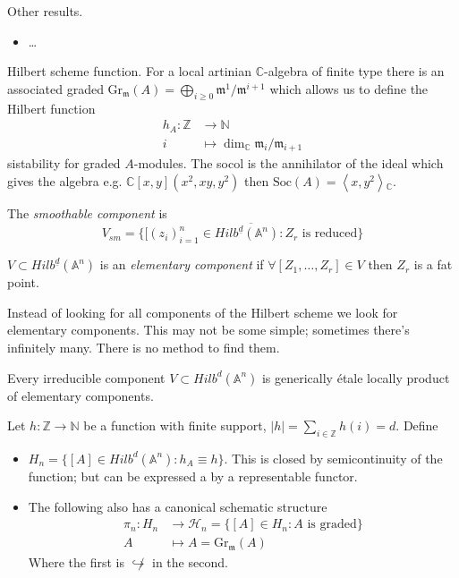 Other results.
\begin{itemize}
\item …
\end{itemize}
Hilbert scheme function.
For a local artinian $\mathbb{C}$-algebra of
finite type there is an associated graded
$\text{Gr}_\mathfrak{m}(A)
=\bigoplus_{i \geq
0}\mathfrak{m}^1/\mathfrak{m}^{i+1}$
which allows us to define the Hilbert
function
$$
\begin{aligned}
h_A: \mathbb{Z} &\longrightarrow \mathbb{N}
\\
i &\longmapsto \dim_\mathbb{C}
\mathfrak{m}_i/\mathfrak{m}_{i+1}
\end{aligned}
$$
sistability for graded $A$-modules.
The socol is the annihilator of
the ideal which gives the algebra
e.g. $\mathbb{C}[x,y](x^2,xy,y^2)$ then
$\text{Soc}(A)=\left\langle{}x,y^2\right\rangle{}_\mathbb{C}
$.

\medskip\noindent
\begin{definition}
\label{definition-smoothable-component}
The {\it smoothable component} is
 $$
V_{sm}=\overline{\{[(z_i)_{i=1}^n \in
Hilb^{\underline{d}}(\mathbb{A}^n):
Z_r\text{ is reduced}\}}
$$
\end{definition}

\begin{definition}
\label{definition-elementary-componenet}
$V \subset
Hilb^{\underline{d}}(\mathbb{A}^n)$ is
an {\it elementary component} if
$\forall [Z_1,\ldots,Z_r] \in V$
then $Z_r$ is a fat point.
\end{definition}

Instead of looking for all components of the
Hilbert scheme
we look for elementary components. This may
not be some simple;
sometimes there's infinitely many. There
is no method to find them.

\begin{theorem}[Irrabaro]
\label{theorem-i}
Every irreducible component $V \subset
Hilb^d(\mathbb{A}^n)$
is generically étale locally product of
elementary components.
\end{theorem}

\begin{definition}
\label{definition-}
Let $h:\mathbb{Z} \to \mathbb{N}$ be a
function
with finite support, $|h|=\sum_{ i \in
\mathbb{Z}}h(i)=d$. Define
\begin{itemize}
\item $H_n=\{[A] \in Hilb^d(\mathbb{A}^n):
h_A \equiv h\}$.
This is closed by semicontinuity of the
function; but can be expressed
a by a representable functor.
\item The following also has a canonical
schematic structure
$$
\begin{aligned}
\pi_n:H_n  &\longrightarrow
\mathcal{H}_n=\{[A] \in H_n: A\text{ is
graded}\} \\
A &\longmapsto A=\text{Gr}_{\mathfrak{m}}(A)
\end{aligned}
$$
Where the first is $\not\hookrightarrow $ in
the second.
\end{itemize}
\end{definition}

